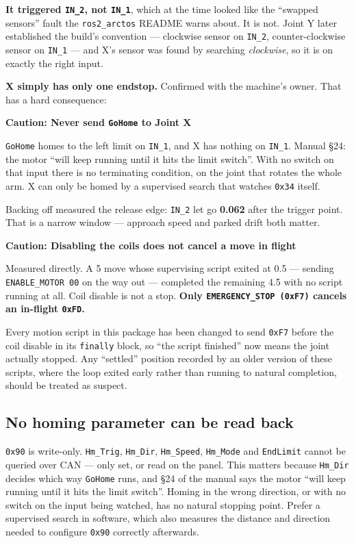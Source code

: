 \documentclass[11pt,letterpaper]{article}
\newenvironment{caution}[1]{%
    \par\addvspace{8pt}%
    \noindent{\color{cautionred}\rule{\linewidth}{0.8pt}}\par\vspace{2pt}
    \noindent\textbf{\color{cautionred}Caution: #1}\par\vspace{2pt}
}{%
    \par\vspace{2pt}\noindent{\color{cautionred}\rule{\linewidth}{0.4pt}}%
    \par\addvspace{8pt}%
}
\begin{document}
\textbf{It triggered \texttt{IN\_2}, not \texttt{IN\_1}}, which at the time looked
like the ``swapped sensors'' fault the \texttt{ros2\_arctos} README warns about.
It is not. Joint Y later established the build's convention --- clockwise sensor
on \texttt{IN\_2}, counter-clockwise sensor on \texttt{IN\_1} --- and X's sensor
was found by searching \emph{clockwise}, so it is on exactly the right input.

\textbf{X simply has only one endstop.} Confirmed with the machine's owner. That
has a hard consequence:

\begin{caution}{Never send \texttt{GoHome} to Joint X}
\texttt{GoHome} homes to the left limit on \texttt{IN\_1}, and X has nothing on
\texttt{IN\_1}. Manual \S24: the motor ``will keep running until it hits the limit
switch''. With no switch on that input there is no terminating condition, on the
joint that rotates the whole arm. X can only be homed by a supervised search that
watches \texttt{0x34} itself.
\end{caution}

Backing off measured the release edge: \texttt{IN\_2} let go
\textbf{0.062\textdegree{}} after the trigger point. That is a narrow window ---
approach speed and parked drift both matter.

\begin{caution}{Disabling the coils does not cancel a move in flight}
Measured directly. A 5\textdegree{} move whose supervising script exited at
0.5\textdegree{} --- sending \texttt{ENABLE\_MOTOR 00} on the way out ---
completed the remaining 4.5\textdegree{} with no script running at all. Coil
disable is not a stop. \textbf{Only \texttt{EMERGENCY\_STOP (0xF7)} cancels an
in-flight \texttt{0xFD}.}

Every motion script in this package has been changed to send \texttt{0xF7} before
the coil disable in its \texttt{finally} block, so ``the script finished'' now
means the joint actually stopped. Any ``settled'' position recorded by an older
version of these scripts, where the loop exited early rather than running to
natural completion, should be treated as suspect.
\end{caution}

\subsection{No homing parameter can be read back}
\texttt{0x90} is write-only. \texttt{Hm\_Trig}, \texttt{Hm\_Dir},
\texttt{Hm\_Speed}, \texttt{Hm\_Mode} and \texttt{EndLimit} cannot be queried over
CAN --- only set, or read on the panel. This matters because \texttt{Hm\_Dir}
decides which way \texttt{GoHome} runs, and \S24 of the manual says the motor
``will keep running until it hits the limit switch''. Homing in the wrong
direction, or with no switch on the input being watched, has no natural stopping
point. Prefer a supervised search in software, which also measures the distance
and direction needed to configure \texttt{0x90} correctly afterwards.
\end{document}

